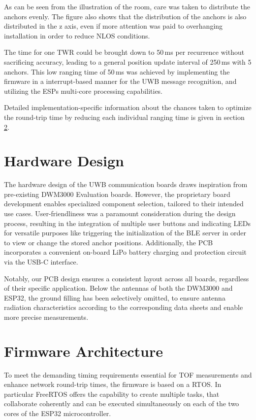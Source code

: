 \documentclass[conference, a4paper]{IEEEtran}
\begin{document}
As can be seen from the illustration of the room, care was taken to distribute the anchors evenly.
The figure also shows that the distribution of the anchors is also distributed in the z axis, even if more attention was paid to overhanging installation in order to reduce \ac{NLOS} conditions.

The time for one \ac{TWR} could be brought down to 50\,ms per recurrence without sacrificing accuracy,
leading to a general position update interval of 250\,ms with 5 anchors. 
This low ranging time of 50\,ms was achieved by implementing the firmware in a interrupt-based manner for the \ac{UWB} message recognition, and utilizing the ESPs multi-core processing capabilities.

Detailed implementation-specific information about the chances taken to optimize the round-trip time by reducing each individual ranging time
is given in section \ref{section:firmware}.


\section{Hardware Design}\label{section:hardware}
The hardware design of the \ac{UWB} communication boards draws inspiration from pre-existing DWM3000 Evaluation
boards.
However, the proprietary board development enables specialized component selection, tailored to their intended use cases.
User-friendliness was a paramount consideration during the design process,
resulting in the integration of multiple user buttons and indicating LEDs for versatile purposes like triggering the initialization of the \ac{BLE} server in order to view or change the stored anchor positions. 
Additionally, the PCB incorporates a convenient on-board LiPo battery charging and protection circuit via the USB-C interface.

Notably, our PCB design ensures a consistent layout across all boards, regardless of their specific application.
Below the antennas of both the DWM3000 and ESP32, the ground filling has been selectively omitted, to ensure antenna radiation characteristics according to the corresponding data sheets and enable more precise measurements.

\section{Firmware Architecture}\label{section:firmware}
To meet the demanding timing requirements essential for \ac{TOF} measurements and enhance network round-trip times,
the firmware is based on a \ac{RTOS}.
In particular FreeRTOS \cite{FreeRTOS_2023} offers the capability to create multiple tasks, that collaborate coherently and can be executed simultaneously on each of the two cores of the ESP32 microcontroller.
\end{document}
